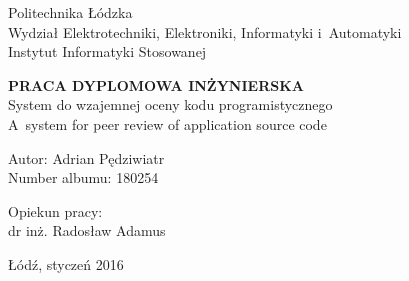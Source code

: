 \begin{titlepage}
	\begin{center}
	\fontsize{12pt}{14pt}\selectfont
	Politechnika Łódzka \\
	Wydział Elektrotechniki, Elektroniki, Informatyki i~Automatyki \\
	Instytut Informatyki Stosowanej \\

	\vspace{3 cm}
	
	\fontsize{13pt}{28pt}\selectfont
    \textbf{PRACA DYPLOMOWA INŻYNIERSKA} \\
    System do wzajemnej oceny kodu programistycznego \\
    A~system for peer review of application source code \\
    
    \vspace{3 cm}

    \fontsize{12pt}{14pt}\selectfont
    Autor: Adrian Pędziwiatr \\
    Number albumu: 180254 \\
    
	\vspace{4 cm}
	
    \begingroup\raggedleft
	Opiekun pracy:\\
	dr inż. Radosław Adamus\par
    \endgroup

	\par\vspace*{\fill}
	Łódź, styczeń 2016

	\end{center}
\end{titlepage}


